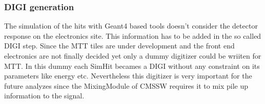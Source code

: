 	\subsubsection{DIGI generation}
		The simulation of the hits with Geant4 based tools doesn't consider the detector response on the electronics site.
		This information has to be added in the so called DIGI step.
		Since the MTT tiles are under development and the front end electronics are not finally decided yet only a dummy digitizer could be wriiten for MTT.
		In this dummy each SimHit becames a DIGI without any constraint on its parameters like energy etc.
		Nevertheless this digitizer is very important for the future analyzes since the MixingModule of CMSSW requires it to mix pile up information to the signal.
